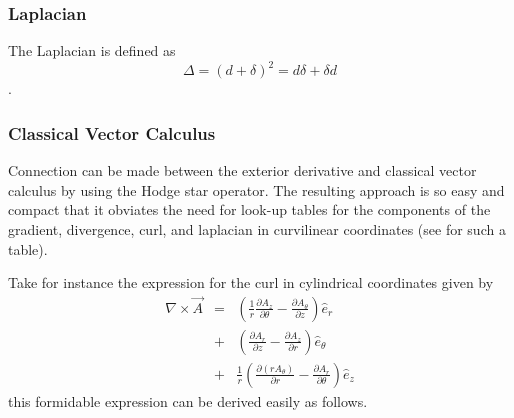 \documentclass[twocolumn]{article}
\begin{document}
\subsubsection{Laplacian}\label{SSS:laplace}

The Laplacian is defined as
\[
  \Delta = (d + \delta)^2 = d \delta + \delta d
\]
\cite{ryder}.

\subsubsection{Classical Vector Calculus}

Connection can be made between the exterior derivative and classical 
vector calculus by using the Hodge star operator.  The resulting 
approach is so easy and compact that it obviates the need for look-up 
tables for the components of the gradient, divergence, curl, and 
laplacian in curvilinear coordinates (see \cite{frankl} for such a 
table).

Take for instance the expression for the curl in cylindrical 
coordinates given by
\begin{eqnarray*}
	\nabla \times {\vec A} & = & 
	                        \left(
	                         \frac{1}{r} 
							 \frac{\partial A_{z}}
							      {\partial \theta}
							 -
							 \frac{\partial A_{\theta}}
							      {\partial z}
	                        \right) {\hat e}_{r} \\
							& + & 
							\left(
							 \frac{\partial A_{r}}
							      {\partial z}
						     -
							 \frac{\partial A_{z}}
							      {\partial r}
							\right) {\hat e}_{\theta} \\
							& + & 
							\frac{1}{r}
							\left(
							 \frac{\partial 
							        \left(r A_{\theta}\right)}
							      {\partial r}
							-
							 \frac{\partial A_{r}}
							      {\partial \theta}
							\right) {\hat e}_{z}
\end{eqnarray*}
this formidable expression can be derived easily as follows.
\end{document}
